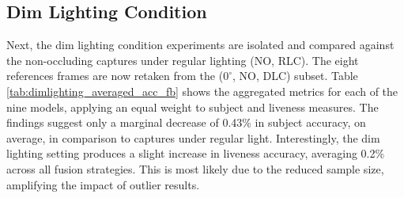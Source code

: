 \documentclass{mpaper}
\begin{document}
\subsection{Dim Lighting Condition}
Next, the dim lighting condition experiments are isolated and compared against the non-occluding captures under regular lighting (NO, RLC). The eight references frames are now retaken from the ($0^\circ$, NO, DLC) subset. Table \ref{tab:dimlighting_averaged_acc_fb} shows the aggregated metrics for each of the nine models, applying an equal weight to subject and liveness measures. The findings suggest only a marginal decrease of 0.43\% in subject accuracy, on average, in comparison to captures under regular light. Interestingly, the dim lighting setting produces a slight increase in liveness accuracy, averaging 0.2\% across all fusion strategies. This is most likely due to the reduced sample size, amplifying the impact of outlier results. 

\begin{table}[htbp]
    \centering
    \vspace{-0.4cm}
    \vspace{0.1cm}
    \caption{Averaged accuracy and $F_{0.5}$ score for the seven fusion strategies and individual modalities, isolated on the \textbf{dim lighting} settings. Equal weighting is applied to subject and liveness predictions.}
    \label{tab:dimlighting_averaged_acc_fb}
    \vspace{-0.5cm}
\end{table}
\end{document}
